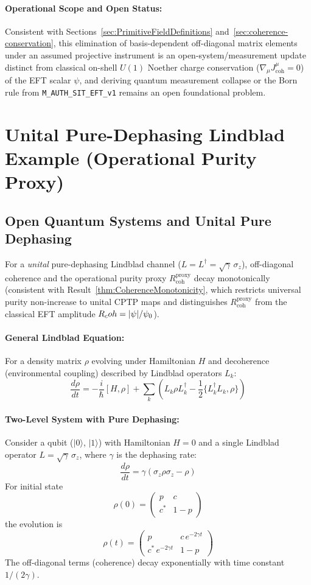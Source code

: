 \paragraph{Operational Scope and Open Status:}
Consistent with Sections~\ref{sec:PrimitiveFieldDefinitions} and~\ref{sec:coherence-conservation}, this elimination of basis-dependent off-diagonal matrix elements under an assumed projective instrument is an open-system/measurement update distinct from classical on-shell $U(1)$ Noether charge conservation ($\nabla_\mu J^\mu_{\mathrm{coh}} = 0$) of the EFT scalar $\psi$, and deriving quantum measurement collapse or the Born rule from \texttt{M\_AUTH\_SIT\_EFT\_v1} remains an open foundational problem.

\section{Unital Pure-Dephasing Lindblad Example (Operational Purity Proxy)}
\label{sec:DecoherenceLindblad}

\subsection{Open Quantum Systems and Unital Pure Dephasing}

For a \emph{unital} pure-dephasing Lindblad channel ($L = L^\dagger = \sqrt{\gamma}\,\sigma_z$), off-diagonal coherence and the operational purity proxy $R_{\mathrm{coh}}^{\mathrm{proxy}}$ decay monotonically (consistent with Result~\ref{thm:CoherenceMonotonicity}, which restricts universal purity non-increase to unital CPTP maps and distinguishes $R_{\mathrm{coh}}^{\mathrm{proxy}}$ from the classical EFT amplitude $R_coh = |\psi|/\psi_0$).

\paragraph{General Lindblad Equation:}
For a density matrix $\rho$ evolving under Hamiltonian $H$ and decoherence (environmental coupling) described by Lindblad operators $L_k$:
\[
\frac{d\rho}{dt} = -\frac{i}{\hbar}[H, \rho] + \sum_k \left( L_k \rho L_k^\dagger - \frac{1}{2}\{L_k^\dagger L_k, \rho\} \right)
\]

\paragraph{Two-Level System with Pure Dephasing:}
Consider a qubit ($|0\rangle$, $|1\rangle$) with Hamiltonian $H=0$ and a single Lindblad operator $L = \sqrt{\gamma}\, \sigma_z$, where $\gamma$ is the dephasing rate:
\[
\frac{d\rho}{dt} = \gamma \left( \sigma_z \rho \sigma_z - \rho \right)
\]
For initial state
\[
\rho(0) = \begin{pmatrix} p & c \\ c^* & 1-p \end{pmatrix}
\]
the evolution is
\[
\rho(t) = \begin{pmatrix} p & c\, e^{-2\gamma t} \\ c^*\, e^{-2\gamma t} & 1-p \end{pmatrix}
\]
The off-diagonal terms (coherence) decay exponentially with time constant $1/(2\gamma)$.

